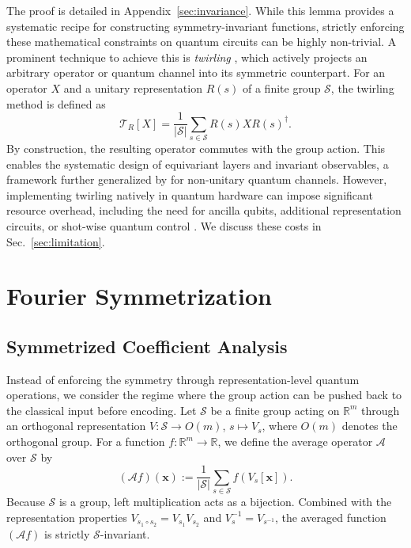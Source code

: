 \documentclass[%
 reprint,
 amsmath,amssymb,
 aps,
 pra,
]{revtex4-2}
\theoremstyle{definition}
\begin{document}
The proof is detailed in Appendix~\ref{sec:invariance}. While this lemma provides a systematic recipe for constructing symmetry-invariant functions, strictly enforcing these mathematical constraints on quantum circuits can be highly non-trivial. A prominent technique to achieve this is \textit{twirling} \cite{Meyer2023}, which actively projects an arbitrary operator or quantum channel into its symmetric counterpart. For an operator \(X\) and a unitary representation \(R(s)\) of a finite group \(\mathcal{S}\), the twirling method is defined as
\begin{equation}
\label{eq:twirling}
\mathcal{T}_R[X]=\frac{1}{|\mathcal{S}|} \sum_{s \in \mathcal{S}} R(s) X R(s)^{\dagger}.
\end{equation}
By construction, the resulting operator commutes with the group action. This enables the systematic design of equivariant layers and invariant observables, a framework further generalized by \citet{Nguyen2024} for non-unitary quantum channels. However, implementing twirling natively in quantum hardware can impose significant resource overhead, including the need for ancilla qubits, additional representation circuits, or shot-wise quantum control \cite{Nguyen2024}. We discuss these costs in Sec.~\ref{sec:limitation}.

\section{Fourier Symmetrization}

\subsection{Symmetrized Coefficient Analysis}
\label{sec:coefficient_analysis}

Instead of enforcing the symmetry through representation-level quantum operations, we consider the regime where the group action can be pushed back to the classical input before encoding. Let \(\mathcal{S}\) be a finite group acting on \(\mathbb{R}^m\) through an orthogonal representation \(V:\mathcal{S}\to O(m)\), \(s\mapsto V_s\), where \(O(m)\) denotes the orthogonal group. For a function \(f:\mathbb{R}^m\to\mathbb{R}\), we define the average operator \(\mathcal{A}\) over \(\mathcal{S}\) by
\begin{equation}
\label{eq:group_op_def}
(\mathcal{A} f)(\bm{x}):=\frac{1}{|\mathcal{S}|}\sum_{s\in\mathcal{S}} f\left(V_s [\bm{x}]\right).
\end{equation}
Because \(\mathcal{S}\) is a group, left multiplication acts as a bijection. Combined with the representation properties \(V_{s_1 \circ s_2} = V_{s_1} V_{s_2}\) and \(V_s^{-1} = V_{s^{-1}}\), the averaged function \((\mathcal{A} f)\) is strictly \(\mathcal{S}\)-invariant.
\end{document}
